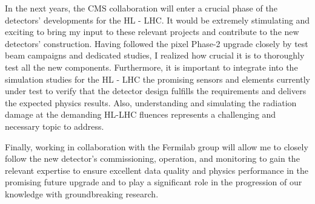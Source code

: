 {\begin{flushleft}
\vspace{\baselineskip}

In the next years, the CMS collaboration will enter a crucial phase of the detectors' developments for the HL - LHC.  It would be extremely stimulating and exciting to bring my input to these relevant projects and contribute to the new detectors' construction. Having followed the pixel Phase-2 upgrade closely by test beam campaigns and dedicated studies, I realized how crucial it is to thoroughly test all the new components. Furthermore, it is important to integrate into the simulation studies for the HL - LHC the promising sensors and elements currently under test to verify that the detector design fulfills the requirements and delivers the expected physics results. Also, understanding and simulating the radiation damage at the demanding HL-LHC fluences represents a challenging and necessary topic to address. 

\vspace{\baselineskip}

Finally, working in collaboration with the Fermilab group will allow me to closely follow the new detector's commissioning, operation, and monitoring to gain the relevant expertise to ensure excellent data quality and physics performance in the promising future upgrade and to play a significant role in the progression of our knowledge with groundbreaking research.
\vspace{\baselineskip}


\end{flushleft}
}

